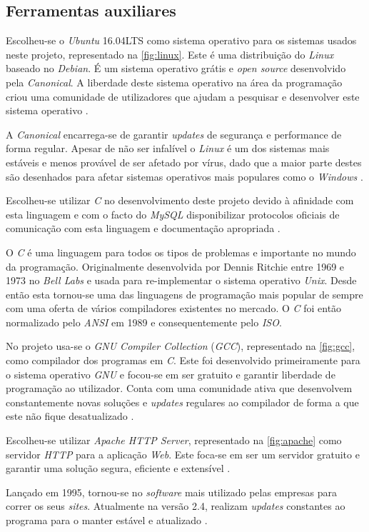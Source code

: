 \documentclass[11pt,twoside,a4paper]{report}
\begin{document}
\subsection{Ferramentas auxiliares}
Escolheu-se o \textit{Ubuntu} 16.04LTS como sistema operativo para os sistemas usados neste projeto, representado na \autoref{fig:linux}. Este é uma distribuição do \textit{Linux} baseado no \textit{Debian}. É um sistema operativo grátis e \textit{open source} desenvolvido pela \textit{Canonical}. A liberdade deste sistema operativo na área da programação criou uma comunidade de utilizadores que ajudam a pesquisar e desenvolver este sistema operativo \cite{ubuntu}.\par 
A \textit{Canonical} encarrega-se de garantir \textit{updates} de segurança e performance de forma regular. Apesar de não ser infalível o \textit{Linux} é um dos sistemas mais estáveis e menos provável de ser afetado por vírus, dado que a maior parte destes são desenhados para afetar sistemas operativos mais populares como o \textit{Windows} \cite{ubuntu}.\par
Escolheu-se utilizar \textit{C} no desenvolvimento deste projeto devido à afinidade com esta linguagem e com o facto do \textit{MySQL} disponibilizar protocolos oficiais de comunicação com esta linguagem e documentação apropriada \cite{mysql}.\par
O \textit{C} é uma linguagem para todos os tipos de problemas e importante no mundo da programação. Originalmente desenvolvida por Dennis Ritchie entre 1969 e 1973 no \textit{Bell Labs} e usada para re-implementar o sistema operativo \textit{Unix}. Desde então esta tornou-se uma das linguagens de programação mais popular de sempre com uma oferta de vários compiladores existentes no mercado. O \textit{C} foi então normalizado pelo \textit{ANSI} em 1989 e consequentemente pelo \textit{ISO}.\par 
No projeto usa-se o \textit{GNU Compiler Collection} (\textit{GCC}), representado na \autoref{fig:gcc}, como compilador dos programas em \textit{C}. Este foi desenvolvido primeiramente para o sistema operativo \textit{GNU} e focou-se em ser gratuito e garantir liberdade de programação ao utilizador. Conta com uma comunidade ativa que desenvolvem constantemente novas soluções e \textit{updates} regulares ao compilador de forma a que este não fique desatualizado \cite{gcc}.\par 
Escolheu-se utilizar \textit{Apache HTTP Server}, representado na \autoref{fig:apache} como servidor \textit{HTTP} para a aplicação \textit{Web}. Este foca-se em ser um servidor gratuito e garantir uma solução segura, eficiente e extensível \cite{apache}.\par
Lançado em 1995, tornou-se no \textit{software} mais utilizado pelas empresas para correr os seus \textit{sites}. Atualmente na versão 2.4, realizam \textit{updates} constantes ao programa para o manter estável e atualizado \cite{apache}.
\end{document}
